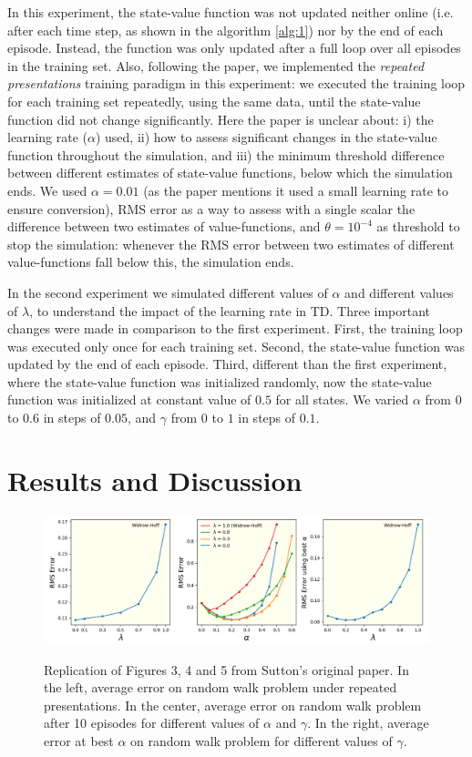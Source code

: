 \documentclass{article}
\begin{document}
In this experiment, the state-value function was not updated neither online (i.e. after each time step, as shown in the algorithm \ref{alg:1}) nor by the end of each episode.
Instead, the function was only updated after a full loop over all episodes in the training set.
Also, following the paper, we implemented the \emph{repeated presentations} training paradigm in this experiment: we executed the training loop for each training set repeatedly, using the same data, until the state-value function did not change significantly.
Here the paper is unclear about: i) the learning rate ($\alpha$) used, ii) how to assess significant changes in the state-value function throughout the simulation, and iii) the minimum threshold difference between different estimates of state-value functions, below which the simulation ends.
We used $\alpha = 0.01$ (as the paper mentions it used a small learning rate to ensure conversion), RMS error as a way to assess with a single scalar the difference between two estimates of value-functions, and $\theta = 10^{-4}$ as threshold to stop the simulation: whenever the RMS error between two estimates of different value-functions fall below this, the simulation ends.

In the second experiment we simulated different values of $\alpha$ and different values of $\lambda$, to understand the impact of the learning rate in TD.
Three important changes were made in comparison to the first experiment.
First, the training loop was executed only once for each training set.
Second, the state-value function was updated by the end of each episode.
Third, different than the first experiment, where the state-value function was initialized randomly, now the state-value function was initialized at constant value of $0.5$ for all states.
We varied $\alpha$ from $0$ to $0.6$ in steps of $0.05$, and $\gamma$ from $0$
 to $1$ in steps of $0.1$.

\section{Results and Discussion}
\label{sec:results}
\begin{figure}[t]
    \includegraphics[width=\textwidth]{./images/figure.png}
    \centering
    \label{fig:fig2}
    \caption{Replication of Figures 3, 4 and 5 from Sutton's original paper.
    In the left, average error on random walk problem under repeated presentations.
    In the center, average error on random walk problem after 10 episodes for different values of $\alpha$ and $\gamma$.
    In the right, average error at best $\alpha$ on random walk problem for different values of $\gamma$.}
\end{figure}
\end{document}
